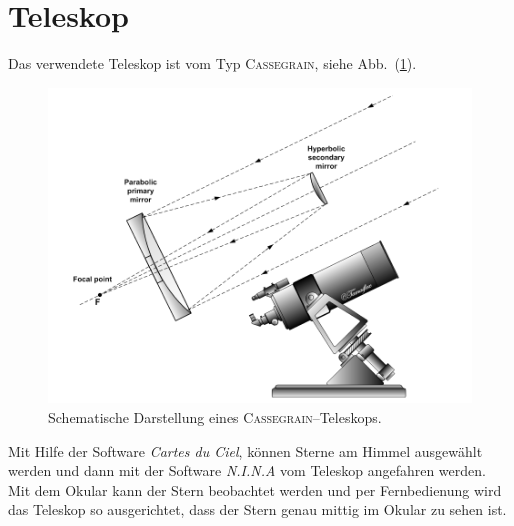 \section{Teleskop}
Das verwendete Teleskop ist vom Typ \textsc{Cassegrain}, siehe Abb.\ (\ref{fig:cassegrain}).
\begin{figure}[t]
  \centering
  \includegraphics[width=.5\textwidth]{Cassegrain.en.png}
  \caption{Schematische Darstellung eines \textsc{Cassegrain}--Teleskops.\cite{wikipediaCassegrain}} \label{fig:cassegrain}
\end{figure}
Mit Hilfe der Software \textit{Cartes du Ciel}, können Sterne am Himmel ausgewählt werden und dann mit der Software \textit{N.I.N.A} vom Teleskop angefahren werden.
Mit dem Okular kann der Stern beobachtet werden und per Fernbedienung wird das Teleskop so ausgerichtet, dass der Stern genau mittig im Okular zu sehen ist.
